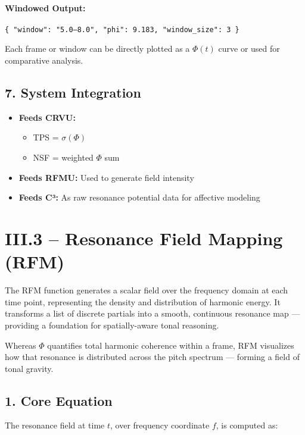 \paragraph{Windowed Output:}

\begin{verbatim}
{ "window": "5.0–8.0", "phi": 9.183, "window_size": 3 }
\end{verbatim}

Each frame or window can be directly plotted as a $\Phi(t)$ curve or used for comparative analysis.

\subsection*{7. System Integration}

\begin{itemize}
    \item \textbf{Feeds CRVU:}
    \begin{itemize}
        \item TPS = $\sigma(\Phi)$
        \item NSF = weighted $\Phi$ sum
    \end{itemize}
    \item \textbf{Feeds RFMU:} Used to generate field intensity
    \item \textbf{Feeds C³:} As raw resonance potential data for affective modeling
\end{itemize}

\section*{III.3 – Resonance Field Mapping (RFM)}

The RFM function generates a scalar field over the frequency domain at each time point, representing the density and distribution of harmonic energy. It transforms a list of discrete partials into a smooth, continuous resonance map — providing a foundation for spatially-aware tonal reasoning.

Whereas $\Phi$ quantifies total harmonic coherence within a frame, RFM visualizes how that resonance is distributed across the pitch spectrum — forming a field of tonal gravity.

\subsection*{1. Core Equation}

The resonance field at time $t$, over frequency coordinate $f$, is computed as:


